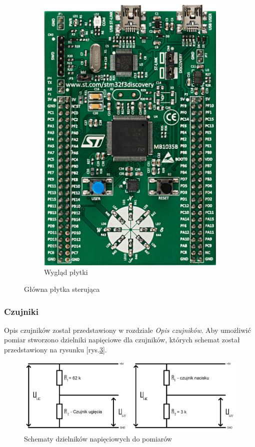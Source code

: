 \documentclass[12pt,a4paper]{article}
\begin{document}
\begin{figure}[!htb]
\begin{subfigure}{.5\textwidth}
	\includegraphics[height=.35\textheight]{images/32f3discovery.jpg}
	\caption{Wygląd płytki}
	\label{fig:gotowa2}
\end{subfigure}
\caption{Główna płytka sterująca}
\label{fig:gotowa_rekawica}
\end{figure}

\newpage
\subsubsection{Czujniki}
Opis czujników został przedstawiony w rozdziale \textit{Opis czujników}. Aby umożliwić pomiar stworzono dzielniki napięciowe dla czujników, których schemat został przedstawiony na rysunku [rys.\ref{fig:dzielnik}].
\begin{figure}[!htb]
\centering
\includegraphics[width=.8\textwidth]{./images/Dzielniki.png}
\caption{Schematy dzielników napięciowych do pomiarów \label{fig:dzielnik}}
\end{figure}
\end{document}
